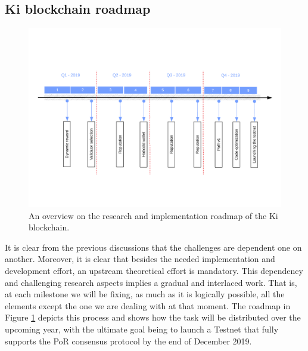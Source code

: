 \subsection{Ki blockchain roadmap}
\begin{figure}[h]
	\includegraphics[width=\linewidth, trim= 1cm 3cm 1cm 3.5cm, clip]{Figures/Roadmap_f.pdf}
	\caption{An overview on the research and implementation roadmap of the Ki blockchain.}
	\label{fig:roadmap}
\end{figure}

It is clear from the previous discussions that the challenges are dependent one on another. Moreover, it is clear that besides the needed implementation and development effort, an upstream theoretical effort is mandatory. This dependency and challenging research aspects implies a gradual and interlaced work. That is, at each milestone we will be fixing, as much as it is logically possible, all the elements except the one we are dealing with at that moment. The roadmap in Figure \ref{fig:roadmap} depicts this process and shows how the task will be distributed over the upcoming year, with the ultimate goal being to launch a Testnet that fully supports the PoR consensus protocol by the end of December 2019.

